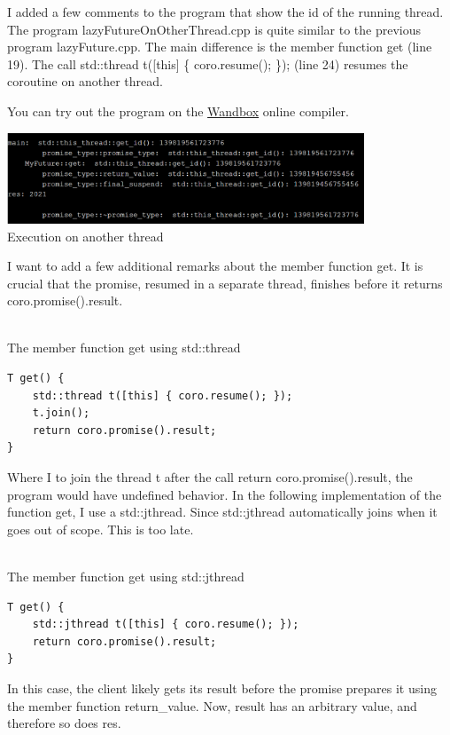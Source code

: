 I added a few comments to the program that show the id of the running thread. The program lazyFutureOnOtherThread.cpp is quite similar to the previous program lazyFuture.cpp. The main difference is the member function get (line 19). The call std::thread t([this] \{ coro.resume(); \}); (line 24) resumes the coroutine on another thread.

You can try out the program on the \href{https://wandbox.org/permlink/jFVVj80Gxu6bnNkc}{Wandbox} online compiler.

\begin{center}
\includegraphics[width=0.8\textwidth]{content/3/chapter7/images/11.png}\\
Execution on another thread
\end{center}

I want to add a few additional remarks about the member function get. It is crucial that the promise, resumed in a separate thread, finishes before it returns coro.promise().result.

\hspace*{\fill} \\ %
\noindent
The member function get using std::thread
\begin{lstlisting}[style=styleCXX]
T get() {
	std::thread t([this] { coro.resume(); });
	t.join();
	return coro.promise().result;
}
\end{lstlisting}

Where I to join the thread t after the call return coro.promise().result, the program would have undefined behavior. In the following implementation of the function get, I use a std::jthread. Since std::jthread automatically joins when it goes out of scope. This is too late.

\hspace*{\fill} \\ %
\noindent
The member function get using std::jthread
\begin{lstlisting}[style=styleCXX]
T get() {
	std::jthread t([this] { coro.resume(); });
	return coro.promise().result;
}
\end{lstlisting}

In this case, the client likely gets its result before the promise prepares it using the member function return\_value. Now, result has an arbitrary value, and therefore so does res.

